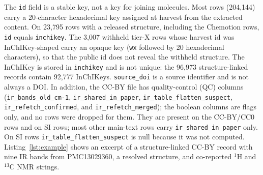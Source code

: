 \documentclass[pdflatex,sn-nature]{sn-jnl}
\begin{document}
The \texttt{id} field is a stable key, not a key for joining molecules.
Most rows (204,144) carry a 20-character hexadecimal key assigned at harvest from the
extracted content.
On 23,795 rows with a released structure, including the
Chemotion rows, \texttt{id} equals \texttt{inchikey}.
The 3,007 withheld tier-X rows whose harvest id was InChIKey-shaped carry an opaque
key (\texttt{wx} followed by 20 hexadecimal characters), so that the public id does
not reveal the withheld structure.
The InChIKey is stored in \texttt{inchikey} and is not unique: the 96,973
structure-linked records contain 92,777 InChIKeys.
\texttt{source\_doi} is a source identifier and is not always a DOI.
In addition, the CC-BY file has quality-control (QC) columns (\texttt{ir\_bands\_old\_cm-1},
\texttt{ir\_shared\_in\_paper}, \texttt{ir\_table\_flatten\_suspect},
\texttt{ir\_refetch\_confirmed}, and \texttt{ir\_refetch\_merged}); the boolean
columns are flags only, and no rows were dropped for them.
They are present on the CC-BY/CC0 rows and on SI rows; most other main-text rows carry
\texttt{ir\_shared\_in\_paper} only.
On SI rows \texttt{ir\_table\_flatten\_suspect} is null because it was not computed.
Listing~\ref{lst:example} shows an excerpt of a structure-linked CC-BY record
with nine IR bands from PMC13029360, a resolved structure, and co-reported $^{1}$H
and $^{13}$C NMR strings.
\end{document}
